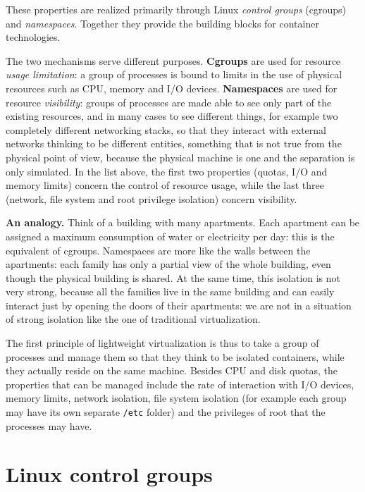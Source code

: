 These properties are realized primarily through Linux \emph{control groups} (cgroups) and \emph{namespaces}. Together they provide the building blocks for container technologies.

The two mechanisms serve different purposes. \textbf{Cgroups} are used for resource \emph{usage limitation}: a group of processes is bound to limits in the use of physical resources such as CPU, memory and I/O devices. \textbf{Namespaces} are used for resource \emph{visibility}: groups of processes are made able to see only part of the existing resources, and in many cases to see different things, for example two completely different networking stacks, so that they interact with external networks thinking to be different entities, something that is not true from the physical point of view, because the physical machine is one and the separation is only simulated. In the list above, the first two properties (quotas, I/O and memory limits) concern the control of resource usage, while the last three (network, file system and root privilege isolation) concern visibility.

\begin{notebox}
	\textbf{An analogy.} Think of a building with many apartments. Each apartment can be assigned a maximum consumption of water or electricity per day: this is the equivalent of cgroups. Namespaces are more like the walls between the apartments: each family has only a partial view of the whole building, even though the physical building is shared. At the same time, this isolation is not very strong, because all the families live in the same building and can easily interact just by opening the doors of their apartments: we are not in a situation of strong isolation like the one of traditional virtualization.
\end{notebox}

The first principle of lightweight virtualization is thus to take a group of processes and manage them so that they think to be isolated containers, while they actually reside on the same machine. Besides CPU and disk quotas, the properties that can be managed include the rate of interaction with I/O devices, memory limits, network isolation, file system isolation (for example each group may have its own separate \texttt{/etc} folder) and the privileges of root that the processes may have.

\section{Linux control groups}

